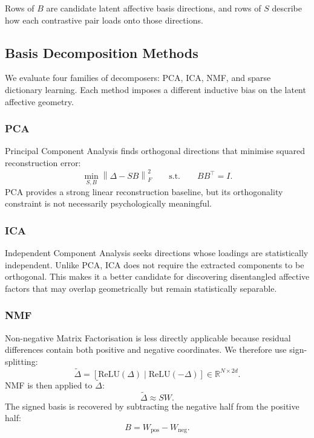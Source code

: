 \documentclass[12pt,twoside]{report}
\begin{document}
Rows of $B$ are candidate latent affective basis directions, and rows of $S$ describe how each contrastive pair loads onto those directions.

\subsection{Basis Decomposition Methods}
\label{sec:emotion_code:basis:decomposers}

We evaluate four families of decomposers: PCA, ICA, NMF, and sparse
dictionary learning. Each method imposes a different inductive bias on
the latent affective geometry.

\subsubsection{PCA}
Principal Component Analysis finds orthogonal directions that minimise
squared reconstruction error:
\begin{equation}
\min_{S,B}
\left\|
\Delta - SB
\right\|_F^2
\qquad
\text{s.t.}
\qquad
BB^\top = I.
\end{equation}
PCA provides a strong linear reconstruction baseline, but its orthogonality constraint is not necessarily psychologically meaningful.

\subsubsection{ICA}
Independent Component Analysis seeks directions whose loadings are statistically independent. Unlike PCA, ICA does not require the extracted components to be orthogonal. This makes it a better candidate for discovering disentangled affective factors that may overlap geometrically but remain statistically separable.

\subsubsection{NMF}
Non-negative Matrix Factorisation is less directly applicable because residual differences contain both positive and negative coordinates. We therefore use sign-splitting:
\begin{equation}
\widetilde{\Delta}
=
\left[
\mathrm{ReLU}(\Delta)
\mid
\mathrm{ReLU}(-\Delta)
\right]
\in
\mathbb{R}^{N\times 2d}.
\end{equation}
NMF is then applied to $\widetilde{\Delta}$:
\begin{equation}
\widetilde{\Delta}
\approx
S W.
\end{equation}
The signed basis is recovered by subtracting the negative half from the positive half:
\begin{equation}
B
=
W_{\mathrm{pos}}
-
W_{\mathrm{neg}}.
\end{equation}
\end{document}
